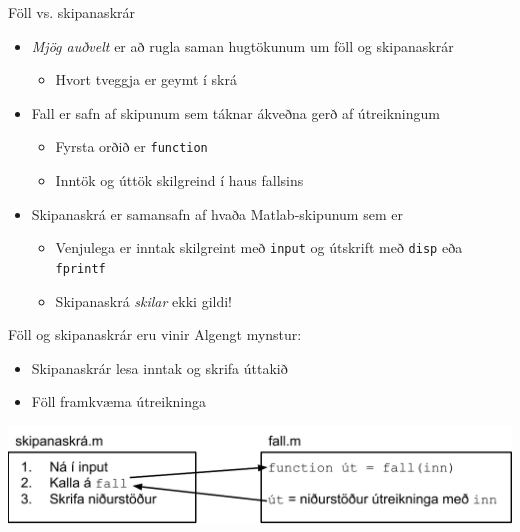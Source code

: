 \documentclass{beamer}
\begin{document}
\begin{frame}{Föll vs. skipanaskrár}
\begin{itemize}
 \item \emph{Mjög auðvelt} er að rugla saman hugtökunum um föll og skipanaskrár
 \begin{itemize}
  \item Hvort tveggja er geymt í skrá
 \end{itemize}
 \item Fall er safn af skipunum sem táknar ákveðna gerð af útreikningum
 \begin{itemize}
  \item Fyrsta orðið er \texttt{function}
  \item Inntök og úttök skilgreind í haus fallsins
 \end{itemize}
 \item Skipanaskrá er samansafn af hvaða Matlab-skipunum sem er
 \begin{itemize}
  \item Venjulega er inntak skilgreint með \texttt{input} og útskrift með \texttt{disp} eða \texttt{fprintf}
  \item Skipanaskrá \emph{skilar} ekki gildi!
 \end{itemize}
\end{itemize}
\end{frame}

\begin{frame}{Föll og skipanaskrár eru vinir}
Algengt mynstur:
\begin{itemize}
 \item Skipanaskrár lesa inntak og skrifa úttakið
 \item Föll framkvæma útreikninga
\end{itemize}

\includegraphics[width=\textwidth]{Pics/skripta-og-fall}
\end{frame}
\end{document}
